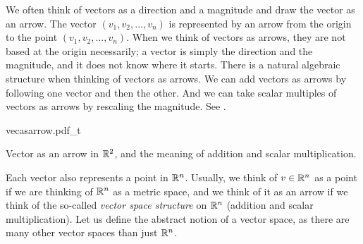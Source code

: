 We often think of vectors as a direction and a magnitude and draw the
vector as an arrow.  The vector $(v_1,v_2,\ldots,v_n)$ is represented
by an arrow from the origin to the point $(v_1,v_2,\ldots,v_n)$.
When we think of vectors as arrows, they are
not based at the origin necessarily; a vector is simply the direction and
the magnitude, and it does not know where it starts.
There is a natural algebraic structure when thinking of vectors as arrows.
We can add vectors as arrows by following one vector and then the other.
And we can take scalar multiples of vectors as arrows by rescaling
the magnitude.  See .
\begin{myfigureht}
{vecasarrow.pdf_t}
\caption{Vector as an arrow in ${\mathbb{R}}^2$, and the meaning of addition and
scalar multiplication.\label{fig:vecasarrow}}
\end{myfigureht}

Each vector also represents a point in ${\mathbb{R}}^n$.  Usually, we think of $v \in {\mathbb{R}}^n$
as a point if we are thinking of ${\mathbb{R}}^n$ as a metric space, and we think of
it as an arrow if we think of the so-called \emph{vector space structure} on
${\mathbb{R}}^n$ (addition and scalar multiplication).
Let us define the abstract notion of a vector space, as there
are many other vector spaces than just ${\mathbb{R}}^n$.

